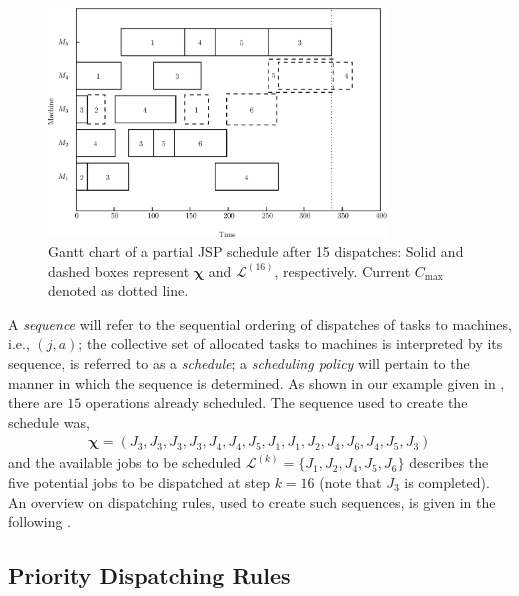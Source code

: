 \documentclass[smallextended]{svjour3}
\renewcommand{\vchi}{\bm \chi}
\begin{document}
\begin{figure}[t!]\centering
  \includegraphics[width=0.8\textwidth]{figures/jssp_example_nocolor.eps}
  \caption[Gantt chart of a partial JSP schedule]{Gantt chart of a
    partial JSP schedule after 15 dispatches: Solid and dashed boxes
    represent $\vchi$ and $\mathcal{L}^{(16)}$, respectively. Current
    $C_{\max}$ denoted as dotted line.}
  \label{fig:jssp:example}
\end{figure}

A \emph{sequence} will refer to the sequential ordering of dispatches of tasks 
to machines, i.e., $(j,a)$; 
the collective set of allocated tasks to machines is interpreted by its 
sequence, is referred to as a \emph{schedule}; 
a \emph{scheduling policy} will pertain to the manner in which 
the sequence is determined.  As shown in our example given in 
, there are $15$ operations already scheduled. The 
sequence used to create the schedule was,
\begin{eqnarray}
  \vchi=\left(J_3,J_3,J_3,J_3,J_4,J_4,J_5,J_1,J_1,J_2,J_4,J_6,J_4,J_5,J_3\right)
\end{eqnarray}
and the available jobs to be scheduled
$\mathcal{L}^{(k)}=\{J_1,J_2,J_4,J_5,J_6\}$ describes the five potential jobs 
to be dispatched at step $k=16$ (note that $J_3$ is completed). An overview on 
dispatching rules, used to create such sequences, is given in the following 
.

\subsection{Priority Dispatching Rules}\label{ch:dispatchrules}
\end{document}
